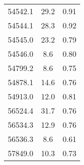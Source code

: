 \documentclass{aa}
\begin{document}
\begin{appendix}
\begin{table}
\begin{tabular}{c c c}
54542.1 & 29.2 & 0.91\\
54544.1 & 28.3 & 0.92\\
54545.0 & 23.2 & 0.79\\
54546.0 &  8.6 & 0.80\\
54799.2 &  8.6 & 0.75\\
54878.1 & 14.6 & 0.76\\
54913.0 & 12.0 & 0.81\\
56524.4 & 31.7 & 0.76\\
56534.3 & 12.9 & 0.76\\
56536.3 &  8.6 & 0.61\\
57849.0 & 10.3 & 0.73\\
\end{tabular}
\end{table}

\end{appendix}
\end{document}
